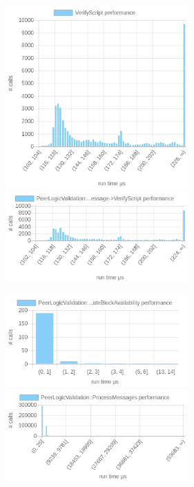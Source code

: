 \documentclass{article}
\begin{document}
\begin{table}
	\includegraphics[width=7cm]{images/london/chartVerifyScript.png}
	\includegraphics[width=7cm]{images/london/chartPeerLogicValidation_3A_3AProcessMessages-_3EProcessMessage-_3EVerifyScript.png}
	
	\includegraphics[width=7cm]{images/london/chartPeerLogicValidation_3A_3AProcessMessages-_3EProcessMessage-_3EUpdateBlockAvailability.png}
	\includegraphics[width=7cm]{images/london/chartPeerLogicValidation_3A_3AProcessMessages.png}
	

\end{table}
\end{document}
